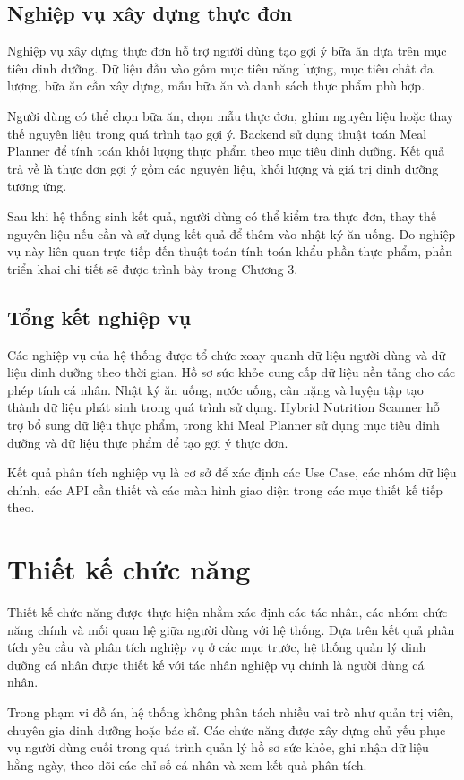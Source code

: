 \documentclass[12pt, a4paper]{report}
\begin{document}
\subsection{Nghiệp vụ xây dựng thực đơn}Nghiệp vụ xây dựng thực đơn hỗ trợ người dùng tạo gợi ý bữa ăn dựa trên mục tiêu dinh dưỡng. Dữ liệu đầu vào gồm mục tiêu năng lượng, mục tiêu chất đa lượng, bữa ăn cần xây dựng, mẫu bữa ăn và danh sách thực phẩm phù hợp.

Người dùng có thể chọn bữa ăn, chọn mẫu thực đơn, ghim nguyên liệu hoặc thay thế nguyên liệu trong quá trình tạo gợi ý. Backend sử dụng thuật toán Meal Planner để tính toán khối lượng thực phẩm theo mục tiêu dinh dưỡng. Kết quả trả về là thực đơn gợi ý gồm các nguyên liệu, khối lượng và giá trị dinh dưỡng tương ứng.

Sau khi hệ thống sinh kết quả, người dùng có thể kiểm tra thực đơn, thay thế nguyên liệu nếu cần và sử dụng kết quả để thêm vào nhật ký ăn uống. Do nghiệp vụ này liên quan trực tiếp đến thuật toán tính toán khẩu phần thực phẩm, phần triển khai chi tiết sẽ được trình bày trong Chương 3.

\subsection{Tổng kết nghiệp vụ}Các nghiệp vụ của hệ thống được tổ chức xoay quanh dữ liệu người dùng và dữ liệu dinh dưỡng theo thời gian. Hồ sơ sức khỏe cung cấp dữ liệu nền tảng cho các phép tính cá nhân. Nhật ký ăn uống, nước uống, cân nặng và luyện tập tạo thành dữ liệu phát sinh trong quá trình sử dụng. Hybrid Nutrition Scanner hỗ trợ bổ sung dữ liệu thực phẩm, trong khi Meal Planner sử dụng mục tiêu dinh dưỡng và dữ liệu thực phẩm để tạo gợi ý thực đơn.

Kết quả phân tích nghiệp vụ là cơ sở để xác định các Use Case, các nhóm dữ liệu chính, các API cần thiết và các màn hình giao diện trong các mục thiết kế tiếp theo.

\section{Thiết kế chức năng}Thiết kế chức năng được thực hiện nhằm xác định các tác nhân, các nhóm chức năng chính và mối quan hệ giữa người dùng với hệ thống. Dựa trên kết quả phân tích yêu cầu và phân tích nghiệp vụ ở các mục trước, hệ thống quản lý dinh dưỡng cá nhân được thiết kế với tác nhân nghiệp vụ chính là người dùng cá nhân.

Trong phạm vi đồ án, hệ thống không phân tách nhiều vai trò như quản trị viên, chuyên gia dinh dưỡng hoặc bác sĩ. Các chức năng được xây dựng chủ yếu phục vụ người dùng cuối trong quá trình quản lý hồ sơ sức khỏe, ghi nhận dữ liệu hằng ngày, theo dõi các chỉ số cá nhân và xem kết quả phân tích.
\end{document}
